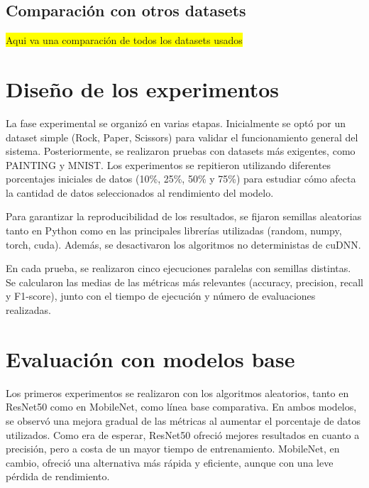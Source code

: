 \subsection{Comparación con otros datasets}\label{subsec:comparacion-con-otros-datasets}
\colorbox{yellow}{Aqui va una comparación de todos los datasets usados}


\section{Diseño de los experimentos}\label{sec:diseño-de-los-experimentos}
La fase experimental se organizó en varias etapas.
Inicialmente se optó por un dataset simple (Rock, Paper, Scissors) para validar el funcionamiento general del sistema.
Posteriormente, se realizaron pruebas con datasets más exigentes, como PAINTING y MNIST. Los experimentos se repitieron utilizando
diferentes porcentajes iniciales de datos (10\%, 25\%, 50\% y 75\%) para estudiar cómo afecta la cantidad de datos seleccionados al rendimiento del modelo.

Para garantizar la reproducibilidad de los resultados, se fijaron semillas aleatorias tanto en Python como en las principales librerías utilizadas
(random, numpy, torch, cuda).
Además, se desactivaron los algoritmos no deterministas de cuDNN.

En cada prueba, se realizaron cinco ejecuciones paralelas con semillas distintas.
Se calcularon las medias de las métricas más relevantes (accuracy, precision, recall y F1-score), junto con el tiempo de ejecución y número
de evaluaciones realizadas.

\section{Evaluación con modelos base}\label{sec:evaluacion-con-modelos-base}
Los primeros experimentos se realizaron con los algoritmos aleatorios, tanto en ResNet50 como en MobileNet, como línea base comparativa.
En ambos modelos, se observó una mejora gradual de las métricas al aumentar el porcentaje de datos utilizados.
Como era de esperar, ResNet50 ofreció mejores resultados en cuanto a precisión, pero a costa de un mayor tiempo de entrenamiento.
MobileNet, en cambio, ofreció una alternativa más rápida y eficiente, aunque con una leve pérdida de rendimiento.

